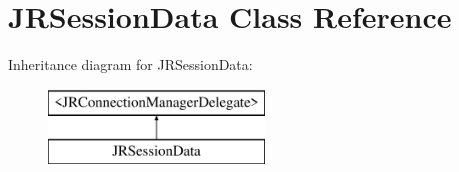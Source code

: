\hypertarget{interface_j_r_session_data}{
\section{JRSessionData Class Reference}
\label{interface_j_r_session_data}
}
Inheritance diagram for JRSessionData:\begin{figure}[H]
\begin{center}
\leavevmode
\includegraphics[height=2.000000cm]{interface_j_r_session_data}
\end{center}
\end{figure}
